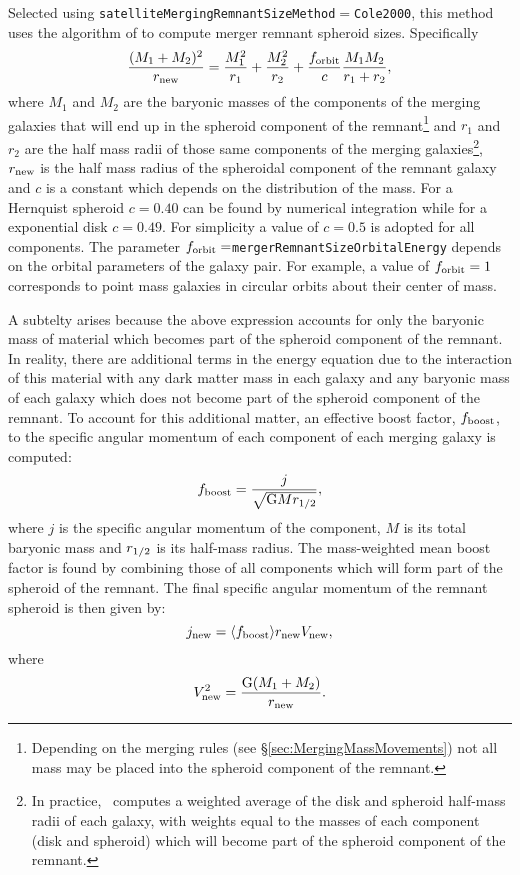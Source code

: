 Selected using {\tt satelliteMergingRemnantSizeMethod}$=${\tt Cole2000}, this method uses the algorithm of \cite{cole_hierarchical_2000} to compute merger remnant spheroid sizes. Specifically
\begin{equation}
\frac{(M_1+M_2)^2}{ r_{\rm new}} =
\frac{M_1^2}{r_1} + \frac{M_2^2}{r_2} + \frac{ f_{\rm orbit}}{c}
\frac{M_1 M_2}{r_1+r_2},
\end{equation}
where $M_1$ and $M_2$ are the baryonic masses of the components of the merging galaxies that will end up in the spheroid \gls{component} of the remnant\footnote{Depending on the merging rules (see \S\protect\ref{sec:MergingMassMovements}) not all mass may be placed into the spheroid \gls{component} of the remnant.} and $r_1$ and $r_2$ are the half mass radii of those same components of the merging galaxies\footnote{In practice, \glc\ computes a weighted average of the disk and spheroid half-mass radii of each galaxy, with weights equal to the masses of each \gls{component} (disk and spheroid) which will become part of the spheroid \gls{component} of the remnant.}, $r_{\rm new}$ is the half mass radius of the spheroidal \gls{component} of the remnant galaxy and $c$ is a constant which depends on the distribution of the mass. For a Hernquist spheroid $c=0.40$ can be found by numerical integration while for a exponential disk $c=0.49$. For simplicity a value of $c=0.5$ is adopted for all components. The parameter $f_{\rm orbit}=${\tt mergerRemnantSizeOrbitalEnergy} depends on the orbital parameters of the galaxy pair. For example, a value of $f_{\rm orbit} = 1$ corresponds to point mass galaxies in circular orbits about their center of mass. 

A subtelty arises because the above expression accounts for only the baryonic mass of material which becomes part of the spheroid \gls{component} of the remnant. In reality, there are additional terms in the energy equation due to the interaction of this material with any dark matter mass in each galaxy and any baryonic mass of each galaxy which does not become part of the spheroid \gls{component} of the remnant. To account for this additional matter, an effective boost factor, $f_{\rm boost}$, to the specific angular momentum of each \gls{component} of each merging galaxy is computed:
\begin{equation}
 f_{\rm boost} = {j \over \sqrt{{\rm G} M r_{1/2}}},
\end{equation}
where $j$ is the specific angular momentum of the component, $M$ is its total baryonic mass and $r_{\rm 1/2}$ is its half-mass radius. The mass-weighted mean boost factor is found by combining those of all components which will form part of the spheroid of the remnant. The final specific angular momentum of the remnant spheroid is then given by:
\begin{equation}
 j_{\rm new} = \langle f_{\rm boost} \rangle r_{\rm new} V_{\rm new},
\end{equation}
where
\begin{equation}
 V_{\rm new}^2 = {{\rm G} (M_1+M_2)\over r_{\rm new}}.
\end{equation}

